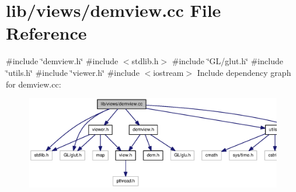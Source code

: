 \section{lib/views/demview.cc \-File \-Reference}
\label{demview_8cc}
{\ttfamily \#include \char`\"{}demview.\-h\char`\"{}}\*
{\ttfamily \#include $<$stdlib.\-h$>$}\*
{\ttfamily \#include \char`\"{}\-G\-L/glut.\-h\char`\"{}}\*
{\ttfamily \#include \char`\"{}utils.\-h\char`\"{}}\*
{\ttfamily \#include \char`\"{}viewer.\-h\char`\"{}}\*
{\ttfamily \#include $<$iostream$>$}\*
\-Include dependency graph for demview.\-cc\-:\nopagebreak
\begin{figure}[H]
\begin{center}
\leavevmode
\includegraphics[width=350pt]{demview_8cc__incl}
\end{center}
\end{figure}
